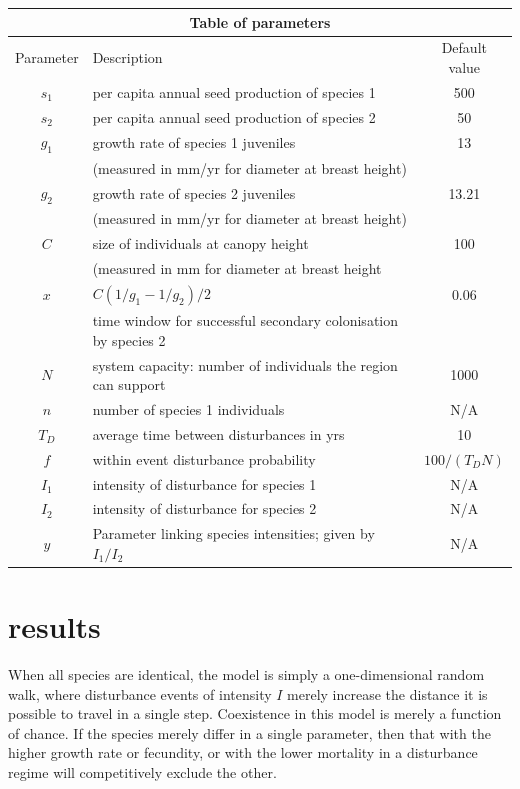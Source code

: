 \begin{center}
\begin{tabular}{|c|l|c|} \hline
\multicolumn{3}{|c|}{Table of parameters} \\ \hline
Parameter & Description & Default value \\ \hline
$s_1$ & per capita annual seed production of species 1 & 500 \\ \hline
$s_2$ & per capita annual seed production of species 2 & 50\\ \hline
$g_1$&growth rate of species 1 juveniles & 13 \\
&(measured in mm/yr for diameter at breast height) &\\ \hline
$g_2$&growth rate of species 2 juveniles & 13.21 \\
&(measured in mm/yr for diameter at breast height) &\\ \hline
$C$& size of individuals at canopy height & 100 \\
& (measured in mm for diameter at breast height&\\ \hline
$x$&$C(1/g_1-1/g_2)/2$&0.06\\
&time window for successful secondary colonisation by species 2&\\ \hline
$N$ & system capacity: number of individuals the region can support & 1000 \\ \hline
$n$ & number of species 1 individuals & N/A \\ \hline
$T_D$& average time between disturbances in yrs & 10 \\ \hline
$f$& within event disturbance probability & $100/(T_D N)$ \\ \hline
$I_1$& intensity of disturbance for species 1 & N/A \\ \hline
$I_2$& intensity of disturbance for species 2 & N/A \\ \hline
$y$ &Parameter linking species intensities; given by $I_1/I_2$ & N/A \\ \hline
\end{tabular} \end{center}

\section{results}
When all species are identical, the model is simply a one-dimensional random walk, where disturbance events of intensity $I$ merely increase the distance it is possible to travel in a single step. Coexistence in this model is merely a function of chance. If the species merely differ in a single parameter, then that with the higher growth rate or fecundity, or with the lower mortality in a disturbance regime will competitively exclude the other.

